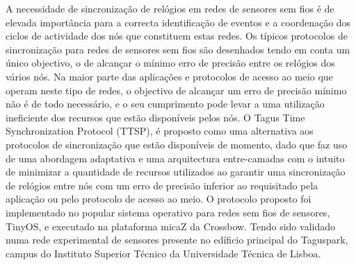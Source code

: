 \begin{resumo}
A necessidade de sincronização de relógios em redes de sensores sem fios é de elevada importância para a correcta identificação de eventos e a coordenação dos ciclos de actividade dos nós que constituem estas redes.
Os típicos protocolos de sincronização para redes de sensores sem fios são desenhados tendo em conta um único objectivo, o de alcançar o mínimo erro de precisão entre os relógios dos vários nós. Na maior parte das aplicações e protocolos de acesso ao meio que operam neste tipo de redes, o objectivo de alcançar um erro de precisão mínimo não é de todo necessário, e o seu cumprimento pode levar a uma utilização ineficiente dos recursos que estão disponíveis pelos nós. 
O Tagus Time Synchronization Protocol (TTSP), é proposto como uma alternativa aos protocolos de sincronização que estão disponíveis de momento, dado que faz uso de uma abordagem adaptativa e uma arquitectura entre-camadas com o intuito de minimizar a quantidade de recursos utilizados ao garantir uma sincronização de relógios entre nós com um erro de precisão inferior ao requisitado pela aplicação ou pelo protocolo de acesso ao meio.
O protocolo proposto foi implementado no popular sistema operativo para redes sem fios de sensores, TinyOS, e executado na plataforma micaZ da Crossbow. Tendo sido validado numa rede experimental de sensores presente no edíficio principal do Taguspark, campus do Instituto Superior Técnico da Universidade Técnica de Lisboa.
\end{resumo}